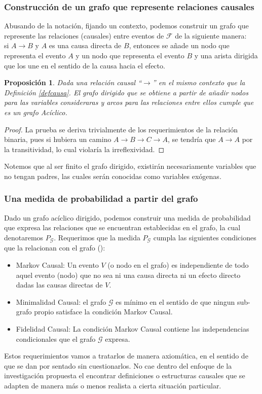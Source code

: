 \documentclass[11pt]{article}
\theoremstyle{plain}
\newtheorem{prop}[teo]{Proposición}
\begin{document}
\subsubsection{Construcción de un grafo que represente relaciones causales}
Abusando de la notación, fijando un contexto, podemos construir un grafo que represente las relaciones (causales) entre eventos de $\mathcal{F}$ de la siguiente manera: \\
si $A \to B$ y $A$ es una causa directa de $B$, entonces se añade un nodo que representa el evento $A$ y un nodo que representa el evento $B$ y una arista dirigida que los une en el sentido de la causa hacia el efecto.
\begin{prop}
Dada una relación causal “$\to$” en el mismo contexto que la Definición \ref{defcausa}. El grafo dirigido que se obtiene a partir de añadir nodos para las variables consideraras y arcos para las relaciones entre ellos cumple que es un grafo Acíclico.
\end{prop}
\begin{proof}
La prueba se deriva trivialmente de los requerimientos de la relación binaria, pues si hubiera un camino $A \to B \to C \to A$, se tendría que $A \to A$ por la transitividad, lo cual violaría la irreflexividad.
\end{proof}
Notemos que al ser finito el grafo dirigido, existirán necesariamente variables que no tengan padres, las cuales serán conocidas como variables exógenas.

\subsubsection{Una medida de probabilidad a partir del grafo}{\label{axiomas}}
Dado un grafo acíclico dirigido, podemos construir una medida de probabilidad que expresa las relaciones que se encuentran establecidas en el grafo, la cual denotaremos $P_{\mathcal{G}}$. Requerimos que la medida $P_{\mathcal{G}}$ cumpla las siguientes condiciones que la relacionan con el grafo (\cite{spirtes2000causation}):
\begin{itemize}
\item Markov Causal: Un evento $V$ (o nodo en el grafo) es independiente de todo aquel evento (nodo) que no sea ni una causa directa ni un efecto directo dadas las causas directas de $V$.
\item Minimalidad Causal: el grafo $\mathcal{G}$ es mínimo en el sentido de que ningun sub-grafo propio satisface la condición Markov Causal.
\item Fidelidad Causal: La condición Markov Causal contiene las independencias condicionales que el grafo $\mathcal{G}$ expresa.
\end{itemize}
\indent Estos requerimientos vamos a tratarlos de manera axiomática, en el sentido de que se dan por sentado sin cuestionarlos. No cae dentro del enfoque de la investigación propuesta el encontrar definiciones o estructuras causales que se adapten de manera más o menos realista a cierta situación particular.
\end{document}
